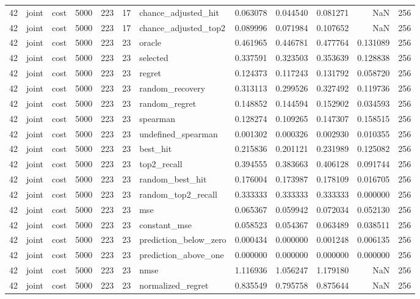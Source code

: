 \begin{tabular}{rllrrrlrrrrr}
42 & joint & cost & 5000 & 223 & 17 & chance_adjusted_hit & 0.063078 & 0.044540 & 0.081271 & NaN & 256 \\
42 & joint & cost & 5000 & 223 & 17 & chance_adjusted_top2 & 0.089996 & 0.071984 & 0.107652 & NaN & 256 \\
42 & joint & cost & 5000 & 223 & 23 & oracle & 0.461965 & 0.446781 & 0.477764 & 0.131089 & 256 \\
42 & joint & cost & 5000 & 223 & 23 & selected & 0.337591 & 0.323503 & 0.353639 & 0.128838 & 256 \\
42 & joint & cost & 5000 & 223 & 23 & regret & 0.124373 & 0.117243 & 0.131792 & 0.058720 & 256 \\
42 & joint & cost & 5000 & 223 & 23 & random_recovery & 0.313113 & 0.299526 & 0.327492 & 0.119736 & 256 \\
42 & joint & cost & 5000 & 223 & 23 & random_regret & 0.148852 & 0.144594 & 0.152902 & 0.034593 & 256 \\
42 & joint & cost & 5000 & 223 & 23 & spearman & 0.128274 & 0.109265 & 0.147307 & 0.158515 & 256 \\
42 & joint & cost & 5000 & 223 & 23 & undefined_spearman & 0.001302 & 0.000326 & 0.002930 & 0.010355 & 256 \\
42 & joint & cost & 5000 & 223 & 23 & best_hit & 0.215836 & 0.201121 & 0.231989 & 0.125082 & 256 \\
42 & joint & cost & 5000 & 223 & 23 & top2_recall & 0.394555 & 0.383663 & 0.406128 & 0.091744 & 256 \\
42 & joint & cost & 5000 & 223 & 23 & random_best_hit & 0.176004 & 0.173987 & 0.178109 & 0.016705 & 256 \\
42 & joint & cost & 5000 & 223 & 23 & random_top2_recall & 0.333333 & 0.333333 & 0.333333 & 0.000000 & 256 \\
42 & joint & cost & 5000 & 223 & 23 & mse & 0.065367 & 0.059942 & 0.072034 & 0.052130 & 256 \\
42 & joint & cost & 5000 & 223 & 23 & constant_mse & 0.058523 & 0.054367 & 0.063489 & 0.038511 & 256 \\
42 & joint & cost & 5000 & 223 & 23 & prediction_below_zero & 0.000434 & 0.000000 & 0.001248 & 0.006135 & 256 \\
42 & joint & cost & 5000 & 223 & 23 & prediction_above_one & 0.000000 & 0.000000 & 0.000000 & 0.000000 & 256 \\
42 & joint & cost & 5000 & 223 & 23 & nmse & 1.116936 & 1.056247 & 1.179180 & NaN & 256 \\
42 & joint & cost & 5000 & 223 & 23 & normalized_regret & 0.835549 & 0.795758 & 0.875644 & NaN & 256 \\

\end{tabular}
